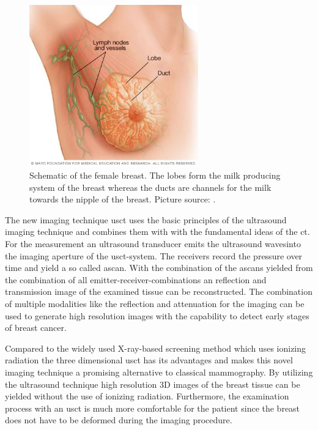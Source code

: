 \begin{figure}[H]
    \centering
    \includegraphics[width=0.65\textwidth]{Graphics/breast.jpg}
    \caption{Schematic of the female breast. The lobes form the milk producing system of the breast whereas the ducts are channels for the milk towards the nipple of the breast. Picture source: \cite{mayo-clinic}. }
    \label{anatomy_breast}
\end{figure}

\hspace{-1cm}
   
The new imaging technique \ac{usct} uses the basic principles of the ultrasound imaging technique and combines them with with the fundamental ideas of the \ac{ct}. For the measurement an ultrasound transducer emits the ultrasound wavesinto the imaging aperture of the \ac{usct}-system. The receivers record the pressure over time and yield a so called \ac{ascan}. With the combination of the \acp{ascan} yielded from the combination of all emitter-receiver-combinations an reflection and transmission image of the examined tissue can be reconstructed. The combination of multiple modalities like the reflection and attenuation for the imaging can be used to generate high resolution images with the capability to detect early stages of breast cancer. 

Compared to the widely used X-ray-based screening method which uses ionizing radiation the three dimensional \ac{usct} has its advantages and makes this novel imaging technique a promising alternative to classical mammography. By utilizing the ultrasound technique high resolution 3D images of the breast tissue can be yielded without the use of ionizing radiation. Furthermore, the examination process with an \ac{usct} is much more comfortable for the patient since the breast does not have to be deformed during the imaging procedure. 





